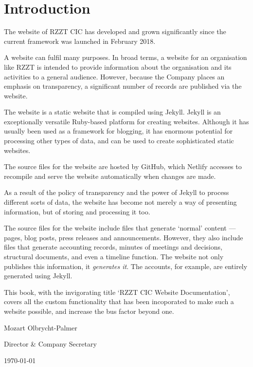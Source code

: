 \chapter{Introduction}

The website of RZZT CIC has developed and grown significantly since the current framework was launched in February 2018.

A website can fulfil many purposes. In broad terms, a website for an organisation like RZZT is intended to provide information about the organisation and its activities to a general audience. However, because the Company places an emphasis on transparency, a significant number of records are published via the website.

The website is a static website that is compiled using Jekyll. Jekyll is an exceptionally versatile Ruby-based platform for creating websites. Although it has usually been used as a framework for blogging, it has enormous potential for processing other types of data, and can be used to create sophisticated static websites.

The source files for the website are hosted by GitHub, which Netlify accesses to recompile and serve the website automatically when changes are made.

As a result of the policy of transparency and the power of Jekyll to process different sorts of data, the website has become not merely a way of presenting information, but of storing and processing it too.

The source files for the website include files that generate `normal' content --- pages, blog posts, press releases and announcements. However, they also include files that generate accounting records, minutes of meetings and decisions, structural documents, and even a timeline function. The website not only publishes this information, it \textit{generates it}. The accounts, for example, are entirely generated using Jekyll.

This book, with the invigorating title `RZZT CIC Website Documentation', covers all the custom functionality that has been incoporated to make such a website possible, and increase the bus factor beyond one.

\vspace{1em}

\hspace{0.5\textwidth}\noindent Mozart Olbrycht-Palmer

\hspace{0.5\textwidth}\noindent Director \& Company Secretary

\hspace{0.5\textwidth}\noindent \today
